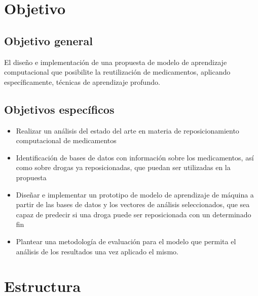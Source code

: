 \section*{Objetivo}
\subsection{Objetivo general}
El diseño e implementación de una propuesta de modelo de aprendizaje computacional que posibilite la reutilización de medicamentos, aplicando específicamente, técnicas de aprendizaje profundo. 

\subsection{Objetivos específicos}

\begin{itemize}
    \item Realizar un análisis del estado del arte en materia de reposicionamiento computacional de medicamentos
    \item Identificación de bases de datos con información sobre los medicamentos, así como sobre drogas ya reposicionadas, que puedan ser utilizadas en la propuesta
    \item Diseñar e implementar un prototipo de modelo de aprendizaje de máquina a partir de las bases de datos y los vectores de análisis seleccionados, que sea capaz de predecir si una droga puede ser reposicionada con un determinado fin
    \item Plantear una metodología de evaluación para el modelo que permita el análisis de los resultados una vez aplicado el mismo.
\end{itemize}

\section*{Estructura}